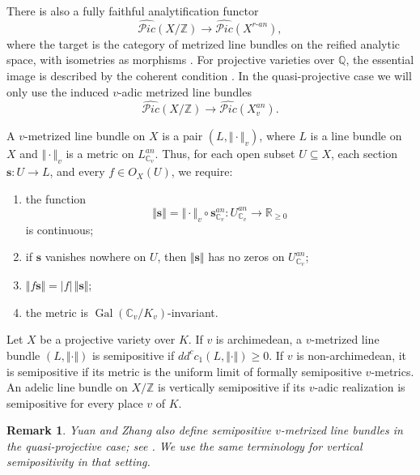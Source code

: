 \documentclass[10pt,a4paper]{amsart}
\theoremstyle{plain}
\newtheorem{remark}[theorem]{Remark}
\theoremstyle{plain}
\numberwithin{equation}{section}
\begin{document}
There is also a fully faithful analytification functor
\[
\widehat{\mathcal{P}ic}(X/\mathbb Z)
\longrightarrow
\widehat{\mathcal{P}ic}(X^{r\text{-}an}),
\]
where the target is the category of metrized line bundles on the reified
analytic space, with isometries as morphisms \cite[Proposition~3.5.1]{YZ}.
For projective varieties over \(\mathbb Q\), the essential image is described
by the coherent condition \cite[Proposition~3.5.2]{YZ}.  In the
quasi-projective case we will only use the induced \(v\)-adic metrized line
bundles
\[
\widehat{\mathcal{P}ic}(X/\mathbb Z)
\longrightarrow
\widehat{\mathcal{P}ic}(X^{an}_v).
\]
\begin{defn}
	A \(v\)-metrized line bundle on \(X\) is a pair
	\((L,\Vert\cdot\Vert_v)\), where \(L\) is a line bundle on \(X\) and
	\(\Vert\cdot\Vert_v\) is a metric on \(L^{an}_{\mathbb C_v}\).  Thus, for
	each open subset \(U\subseteq X\), each section
	\(\boldsymbol s:U\to L\), and every \(f\in O_X(U)\), we require:
	\begin{enumerate}[label=\textup{(\arabic*)},leftmargin=2em]
		\item the function
		\[
		\Vert \boldsymbol s\Vert
		=
		\Vert\cdot\Vert_v\circ \boldsymbol s^{an}_{\mathbb C_v}
		:U^{an}_{\mathbb C_v}\to\mathbb R_{\geq0}
		\]
		is continuous;
		\item if \(\boldsymbol s\) vanishes nowhere on \(U\), then
		\(\Vert \boldsymbol s\Vert\) has no zeros on \(U^{an}_{\mathbb C_v}\);
		\item \(\Vert f\boldsymbol s\Vert=|f|\,\Vert\boldsymbol s\Vert\);
		\item the metric is \(\operatorname{Gal}(\mathbb C_v/K_v)\)-invariant.
	\end{enumerate}
\end{defn}
\begin{defn}
	Let \(X\) be a projective variety over \(K\).  If \(v\) is archimedean, a
	\(v\)-metrized line bundle \((L,\Vert\cdot\Vert)\) is semipositive if
	\(dd^c c_1(L,\Vert\cdot\Vert)\geq0\).  If \(v\) is non-archimedean, it is
	semipositive if its metric is the uniform limit of formally semipositive
	\(v\)-metrics.  An adelic line bundle on \(X/\mathbb Z\) is vertically
	semipositive if its \(v\)-adic realization is semipositive for every place
	\(v\) of \(K\).
\end{defn}
\begin{remark}
	Yuan and Zhang also define semipositive \(v\)-metrized line bundles in the
	quasi-projective case; see \cite[p.~105]{YZ}.  We use the same terminology for
	vertical semipositivity in that setting.
\end{remark}
\end{document}
